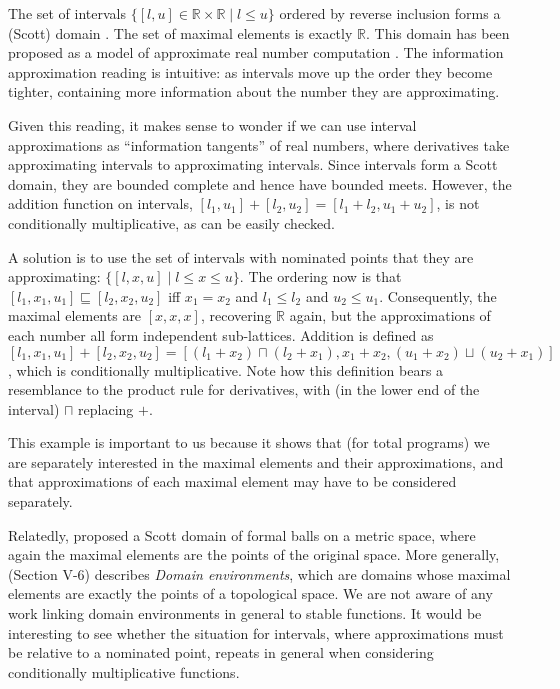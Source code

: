 \begin{example}
  \label{ex:intervals-and-maxima-elements}
  The set of intervals
  $\{ [l,u] \in \mathbb{R} \times \mathbb{R} \mid l \leq u \}$ ordered
  by reverse inclusion forms a (Scott) domain
  \cite{scott-outline}. The set of maximal elements is exactly
  $\mathbb{R}$. This domain has been proposed as a model of
  approximate real number computation \cite{escardo-real-pcf}. The
  information approximation reading is intuitive: as intervals move up
  the order they become tighter, containing more information about the
  number they are approximating.

  Given this reading, it makes sense to wonder if we can use interval
  approximations as ``information tangents'' of real numbers, where
  derivatives take approximating intervals to approximating
  intervals. Since intervals form a Scott domain, they are bounded
  complete and hence have bounded meets. However, the addition
  function on intervals, $[l_1,u_1] + [l_2,u_2] = [l_1+l_2,u_1+u_2]$,
  is not conditionally multiplicative, as can be easily checked.

  A solution is to use the set of intervals with nominated points that
  they are approximating: $\{[l,x,u] \mid l \leq x \leq u\}$. The
  ordering now is that $[l_1,x_1,u_1] \sqsubseteq [l_2,x_2,u_2]$ iff
  $x_1 = x_2$ and $l_1 \leq l_2$ and $u_2 \leq u_1$. Consequently, the
  maximal elements are $[x,x,x]$, recovering $\mathbb{R}$ again, but
  the approximations of each number all form independent sub-lattices.
  Addition is defined as
  $[l_1,x_1,u_1] + [l_2,x_2,u_2] = [(l_1+x_2) \sqcap
  (l_2+x_1),x_1+x_2,(u_1+x_2)\sqcup(u_2+x_1)]$, which is conditionally
  multiplicative. Note how this definition bears a resemblance to the
  product rule for derivatives, with (in the lower end of the
  interval) $\sqcap$ replacing $+$.

  This example is important to us because it shows that (for total
  programs) we are separately interested in the maximal elements and
  their approximations, and that approximations of each maximal
  element may have to be considered separately.

  Relatedly, \citet{edalat-heckmann98} proposed a Scott domain of
  formal balls on a metric space, where again the maximal elements are
  the points of the original space. More generally,
  \citet{continuous-lattice-book} (Section V-6) describes \emph{Domain
    environments}, which are domains whose maximal elements are
  exactly the points of a topological space. We are not aware of any
  work linking domain environments in general to stable functions. It
  would be interesting to see whether the situation for intervals,
  where approximations must be relative to a nominated point, repeats
  in general when considering conditionally multiplicative functions.
\end{example}

